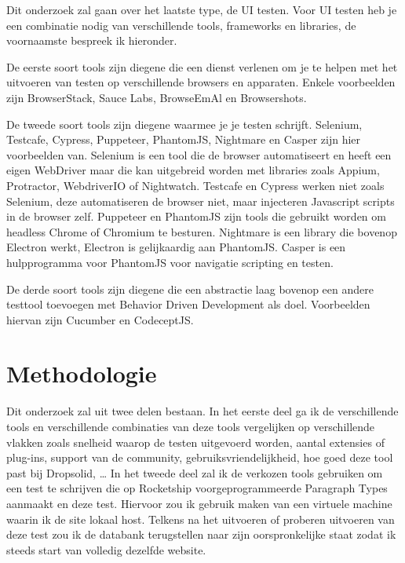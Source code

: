 Dit onderzoek zal gaan over het laatste type, de UI testen. Voor UI testen heb je een combinatie nodig van verschillende tools, frameworks en libraries, de voornaamste bespreek ik hieronder.

De eerste soort tools zijn diegene die een dienst verlenen om je te helpen met het uitvoeren van testen op verschillende browsers en apparaten. Enkele voorbeelden zijn BrowserStack, Sauce Labs, BrowseEmAl en Browsershots. \autocite{Jackson2017}

De tweede soort tools zijn diegene waarmee je je testen schrijft. Selenium, Testcafe, Cypress, Puppeteer, PhantomJS, Nightmare en Casper zijn hier voorbeelden van. Selenium is een tool die de browser automatiseert en heeft een eigen WebDriver maar die kan uitgebreid worden met libraries zoals Appium, Protractor, WebdriverIO of Nightwatch. Testcafe en Cypress werken niet zoals Selenium, deze automatiseren de browser niet, maar injecteren Javascript scripts in de browser zelf. Puppeteer en PhantomJS zijn tools die gebruikt worden om headless Chrome of Chromium te besturen. Nightmare is een library die bovenop Electron werkt, Electron is gelijkaardig aan PhantomJS. Casper is een hulpprogramma voor PhantomJS voor navigatie scripting en testen.

De derde soort tools zijn diegene die een abstractie laag bovenop een andere testtool toevoegen met Behavior Driven Development als doel. Voorbeelden hiervan zijn Cucumber en CodeceptJS. \autocite{Zaidman2018}

\section{Methodologie}
\label{sec:methodologie}

Dit onderzoek zal uit twee delen bestaan. In het eerste deel ga ik de verschillende tools en verschillende combinaties van deze tools vergelijken op verschillende vlakken zoals snelheid waarop de testen uitgevoerd worden, aantal extensies of plug-ins, support van de community, gebruiksvriendelijkheid, hoe goed deze tool past bij Dropsolid, … In het tweede deel zal ik de verkozen tools gebruiken om een test te schrijven die op Rocketship voorgeprogrammeerde Paragraph Types aanmaakt en deze test. Hiervoor zou ik gebruik maken van een virtuele machine waarin ik de site lokaal host. Telkens na het uitvoeren of proberen uitvoeren van deze test zou ik de databank terugstellen naar zijn oorspronkelijke staat zodat ik steeds start van volledig dezelfde website.

